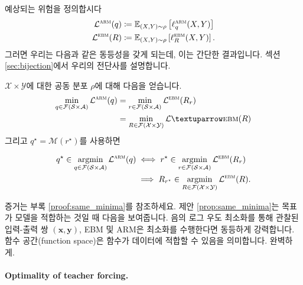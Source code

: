 \documentclass{article}
\def\x{{\bm{x}}}
\def\y{{\bm{y}}}
\def\EE{{\mathbb{E}}}
\def\cA{{\mathcal{A}}}
\def\cF{{\mathcal{F}}}
\def\cL{{\mathcal{L}}}
\def\cM{{\mathcal{M}}}
\def\cS{{\mathcal{S}}}
\def\cX{{\mathcal{X}}}
\def\cY{{\mathcal{Y}}}
\newcommand{\Rsub}[1]{R_{#1}}
\def\arm{{\textsc{arm}}}
\def\ebm{{\textsc{ebm}}}
\def\augvoc{\cA}
\DeclareMathOperator*{\argmin}{argmin}
\begin{document}
예상되는 위험을 정의합시다
 \begin{align} 
 \cL ^ \arm (q) & \coloneqq \EE _{(X,Y) \sim \rho } \left [ \ell ^ \arm _q(X, Y) \right ] 
 \label{eq:expected_risk_arm} \\
 \cL ^ \ebm (R) & \coloneqq \EE _{(X,Y) \sim \rho } \left [ \ell ^ \ebm _R(X, Y) \right ]. 
 \label{eq:expected_risk_ebm} 
 \end{align} 
그러면 우리는 다음과 같은 동등성을 갖게 되는데, 이는 간단한 결과입니다.
섹션 \ref{sec:bijection}에서 우리의 전단사를 설명합니다.
 \begin{proposition} [최소값의 등가] \label{prop:same_minima}

$\cX \times \cY$에 대한 공동 분포 $\rho$에 대해 다음을 얻습니다.
 \begin{align} 
 \min _{q \in \cF ( \cS \times \augvoc )} \cL ^ \arm (q)
&= 
 \min _{r \in \cF ( \cS \times \augvoc )} 
 \cL ^ \ebm ( \Rsub{r} ) \\
&= 
 \min _{R \in \cF ( \cX \times \cY )} 
 \cL ↑ \ebm (R)
 \end{align} 
그리고 $q^\star = \cM(r^\star)$를 사용하면
 \begin{small} 
 \begin{align} 
q^ \star \in \argmin _{q \in \cF ( \cS \times \augvoc )}
 \cL ^ \arm (q) 
& \iff 
r^ \star \in \argmin _{r \in \cF ( \cS \times \augvoc )} 
 \cL ^ \ebm ( \Rsub{r} ) \\
& \implies 
 \Rsub{r^\star} \in \argmin _{R \in \cF ( \cX \times \cY )} 
 \cL ^ \ebm (R).
 \end{align} 
 \end{small} 
 \end{proposition} 
증거는 부록 \ref{proof:same_minima}를 참조하세요.
제안 \ref{prop:same_minima}는 목표가 모델을 적합하는 것일 때 다음을 보여줍니다.
음의 로그 우도 최소화를 통해 관찰된 입력-출력 쌍 $(\x, \y)$, EBM 및
ARM은 최소화를 수행한다면 동등하게 강력합니다.
함수 공간(function space)은 함수가 데이터에 적합할 수 있음을 의미합니다.
완벽하게.

\paragraph{Optimality of teacher forcing.}
\end{document}
